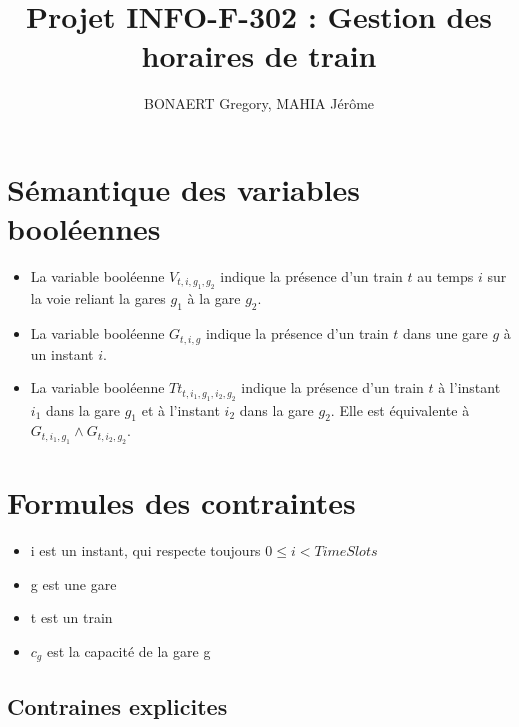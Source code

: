 \documentclass[a4paper]{article}
\title{Projet INFO-F-302 : Gestion des horaires de train}
\author{BONAERT Gregory, MAHIA Jérôme}
\begin{document}
\maketitle

\section{Sémantique des variables booléennes}

\begin{itemize}
\item La variable booléenne $V_{t,i,g_{1},g_{2}}$ indique la présence d'un train $t$ au temps $i$ sur la voie reliant la gares $g_{1}$ à la gare $g_{2}$.
\item La variable booléenne $G_{t,i,g}$ indique la présence d'un train $t$ dans une gare $g$ à un instant $i$.
\item La variable booléenne $Tt_{t,i_{1},g_{1},i_{2},g_{2}}$ indique la présence d'un train $t$ à l'instant $i_{1}$ dans la gare $g_{1}$ et à l'instant $i_{2}$ dans la gare $g_{2}$. Elle est équivalente à $G_{t,i_{1},g_{1}} \land G_{t,i_{2},g_{2}}$.
\end{itemize}


\section{Formules des contraintes}


\begin{itemize}
\item i est un instant, qui respecte toujours $0 \leq i < TimeSlots$
\item g est une gare
\item t est un train
\item $c_g$ est la capacité de la gare g
\end{itemize}

\subsection{Contraines explicites}
\end{document}
